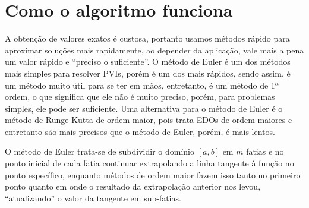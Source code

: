 \section*{Como o algoritmo funciona}

A obtenção de valores exatos é custosa, portanto usamos métodos rápido para aproximar soluções mais rapidamente, ao depender da aplicação, vale mais a pena um valor rápido e ``preciso o suficiente''. O método de Euler é um dos métodos mais simples para resolver PVIs, porém é um dos mais rápidos, sendo assim, é um método muito útil para se ter em mãos, entretanto, é um método de 1ª ordem, o que significa que ele não é muito preciso, porém, para problemas simples, ele pode ser suficiente. Uma alternativa para o método de Euler é o método de Runge-Kutta de ordem maior, pois trata EDOs de ordem maiores e entretanto são mais precisos que o método de Euler, porém, é mais lentos.

O método de Euler trata-se de subdividir o domínio $[a, b]$ em $m$ fatias e no ponto inicial de cada fatia continuar extrapolando a linha tangente à função no ponto específico, enquanto métodos de ordem maior fazem isso tanto no primeiro ponto quanto em onde o resultado da extrapolação anterior nos levou, ``atualizando'' o valor da tangente em sub-fatias.
